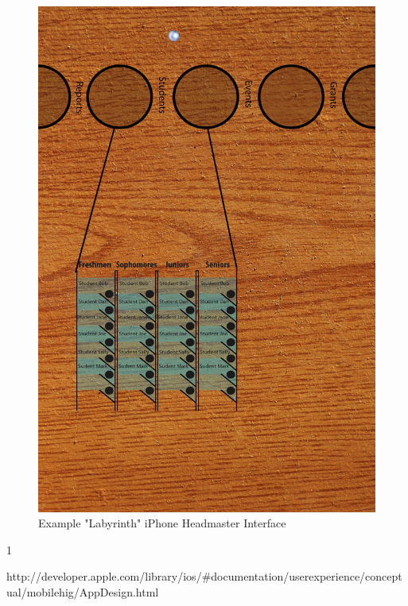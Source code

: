 \documentclass{article}
\begin{document}
\begin{figure}
\centering
\includegraphics[width=140mm]{labyrinth-start.jpg}
\caption{Example "Labyrinth" iPhone Headmaster Interface}
\label{overflow}
\end{figure}
\pagebreak

\begin{thebibliography} {1}

http://developer.apple.com/library/ios/\#documentation/userexperience/conceptual/mobilehig/AppDesign.html

\end{thebibliography}
\end{document}
